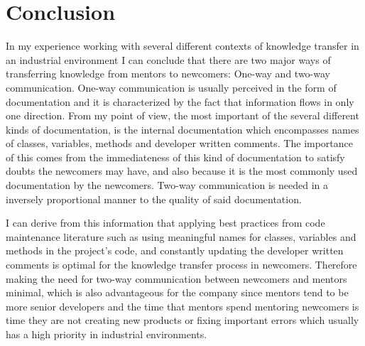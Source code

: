 \documentclass[12pt, letterpaper]{article}
\begin{document}
\section{Conclusion}

In my experience working with several different contexts of knowledge transfer in an industrial environment
I can conclude that there are two major ways of transferring knowledge from mentors to newcomers: One-way
and two-way communication. One-way communication is usually perceived in the form of documentation and it 
is characterized by the fact that information flows in only one direction. From my point of view, the most 
important of the several different kinds of documentation, is the internal documentation which encompasses
names of classes, variables, methods and developer written comments. The importance of this comes from
the immediateness of this kind of documentation to satisfy doubts the newcomers may have, and also because
it is the most commonly used documentation by the newcomers. Two-way communication is needed in a inversely 
proportional manner to the quality of said documentation.

I can derive from this information that applying best practices from code maintenance literature such as 
using meaningful names for classes, variables and methods in the project's code, and constantly updating
the developer written comments is optimal for the knowledge transfer process in newcomers. Therefore making
the need for two-way communication between newcomers and mentors minimal, which is also advantageous for the
company since mentors tend to be more senior developers and the time that mentors spend mentoring newcomers
is time they are not creating new products or fixing important errors which usually has a high priority
in industrial environments.

 




 
\end{document}
